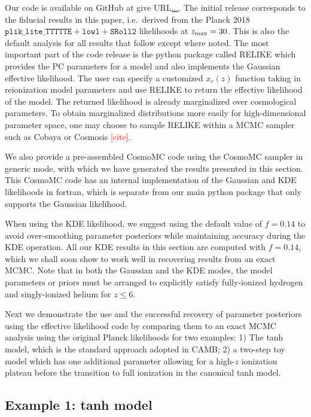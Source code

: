 \documentclass[prd,twocolumn,amsmath,amssymb,floatfix,superscriptaddress,nofootinbib]{revtex4-1}
\newcommand{\zmax}{z_{\rm max}}
\newcommand{\ch}[1]{\textcolor{red}{#1}}
\begin{document}
Our code is available on GitHub at {give URL\url{...}}. The initial release corresponds to the fiducial results in this paper, i.e.\ derived from the Planck 2018 $\texttt{plik\_lite\_TTTTTE} + \texttt{lowl} + \texttt{SRoll2}$ likelihoods at $\zmax = 30$.  
This is also the default analysis for all results that follow except where noted.
The most important part of the code release is the python package called RELIKE which provides the PC parameters for a model and also
implements the Gaussian effective likelihood. The user can specify a customized $x_e(z)$ function taking in reionization model parameters and use RELIKE to return the effective likelihood of the model. The returned likelihood is already marginalized over cosmological parameters. 
To obtain marginalized distributions more easily for high-dimensional parameter space, one may choose to sample RELIKE within a MCMC sampler such as Cobaya or Cosmosis \ch{[cite]}.


We also provide a pre-assembled CosmoMC code using the CosmoMC sampler in generic mode, with which we have generated the results presented in this section. This CosmoMC code has an internal  implementation of the Gaussian and KDE likelihoods in fortran, which is separate from our main python package that only supports the Gaussian likelihood. 

When using the KDE likelihood, we suggest using the default value of $f = 0.14$ to avoid over-smoothing parameter posteriors while maintaining accuracy during the KDE operation. All our KDE results in this section are computed with $f = 0.14$, which we shall soon show to work well in recovering results from an exact MCMC. Note that in both the Gaussian and the KDE modes, the model parameters or priors must be arranged to explicitly satisfy fully-ionized hydrogen and singly-ionized helium for $z\leq 6$. 

Next we demonstrate the use and the successful recovery of parameter posteriors using the effective likelihood code by comparing them to an exact MCMC analysis using the original Planck likelihoods for two examples: 1) The tanh model, which is the standard approach adopted in CAMB; 2) a two-step toy model which has one additional parameter allowing for a high-$z$ ionization plateau before the transition to full ionization in the canonical tanh model.

\subsection{Example 1: tanh model}
\label{sec:example1}
\end{document}
